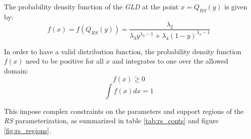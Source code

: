 The probability density function of the \textit{GLD} at the point $x=Q_{RS}(y)$ is given by:
\begin{equation}\label{eq:rs_pdf}
f(x)=f(Q_{RS}(y))=\frac{\lambda_{2}}{\lambda_{3}y^{\lambda_{3}-1}+\lambda_{4}(1-y)^{\lambda_{4}-1}}
\end{equation}

In order to have a valid distribution function, the probability density function $f(x)$ need to be positive for all $x$ and integrates to one over the allowed domain:
\begin{equation}
f(x) \geqslant 0
\end{equation}
\begin{equation}
\int f(x)dx=1
\end{equation}

This impose complex constraints on the parameters and support regions of the \textit{RS} parameterization, as summarized in table \ref{tab:rs_conts} and figure \ref{fig:rs_regions}.


